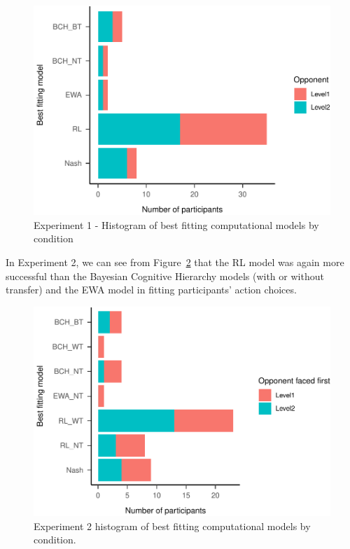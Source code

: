 \documentclass[
  english,
  man,floatsintext]{apa6}
\begin{document}
\begin{figure}

{\centering \includegraphics[width=\textwidth]{paper_draft_2021_files/figure-latex/exp1-comp-models-1} 

}

\caption{Experiment 1 - Histogram of best fitting computational models by condition}\label{fig:exp1-comp-models}
\end{figure}



In Experiment 2, we can see from Figure~\ref{fig:exp2-comp-models} that the RL model was again more successful than the Bayesian Cognitive Hierarchy models (with or without transfer) and the EWA model in fitting participants' action choices.

\begin{figure}

{\centering \includegraphics[width=\textwidth]{paper_draft_2021_files/figure-latex/exp2-comp-models-1} 

}

\caption{Experiment 2 histogram of best fitting computational models by condition.}\label{fig:exp2-comp-models}
\end{figure}
\end{document}
